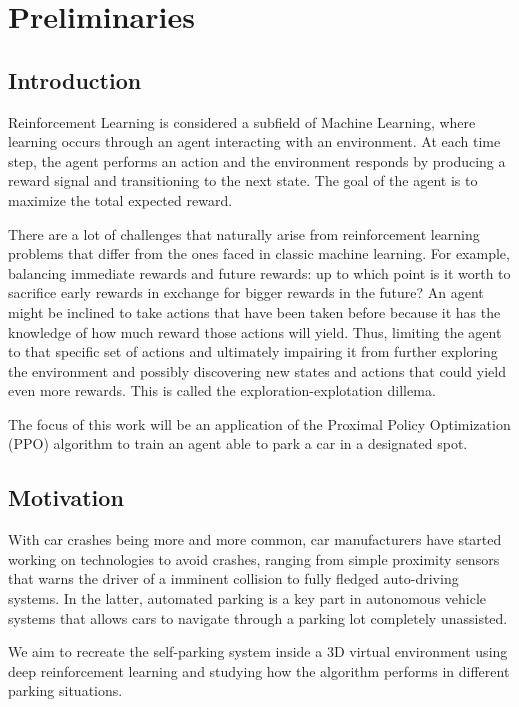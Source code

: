 \chapter{Preliminaries}
\label{cap:introducao}

\section{Introduction}

Reinforcement Learning is considered a subfield of Machine Learning, where learning occurs through an agent interacting with an environment. At each time step, the agent performs an action and the environment responds by producing a reward signal and transitioning to the next state. The goal of the agent is to maximize the total expected reward. \cite{suttonbarto}

There are a lot of challenges that naturally arise from reinforcement learning problems that differ from the ones faced in classic machine learning. For example, balancing immediate rewards and future rewards: up to which point is it worth to sacrifice early rewards in exchange for bigger rewards in the future? An agent might be inclined to take actions that have been taken before because it has the knowledge of how much reward those actions will yield. Thus, limiting the agent to that specific set of actions and ultimately impairing it from further exploring the environment and possibly discovering new states and actions that could yield even more rewards. This is called the exploration-explotation dillema. \cite{suttonbarto}


The focus of this work will be an application of the Proximal Policy Optimization (PPO) algorithm to train an agent able to park a car in a designated spot.

\section{Motivation}
With car crashes being more and more common, car manufacturers have started working on technologies to avoid crashes, ranging from simple proximity sensors that warns the driver of a imminent collision to fully fledged auto-driving systems. In the latter, automated parking is a key part in autonomous vehicle systems that allows cars to navigate through a parking lot completely unassisted.

We aim to recreate the self-parking system inside a 3D virtual environment using deep reinforcement learning and studying how the algorithm performs in different parking situations.